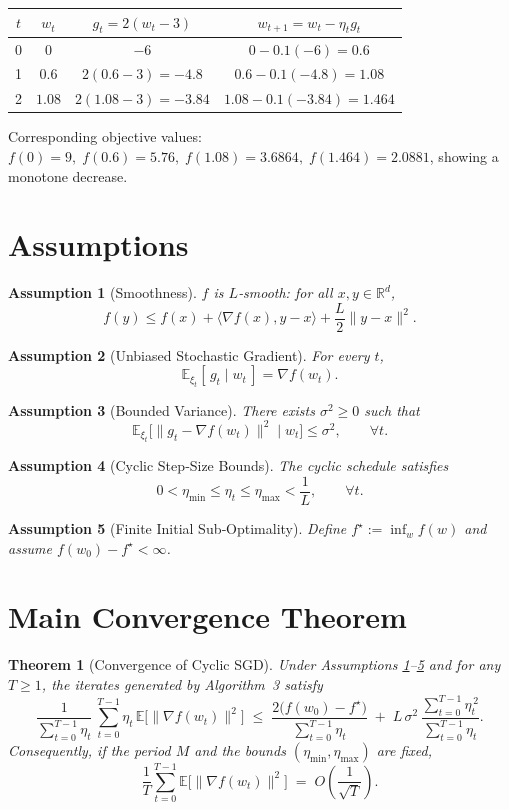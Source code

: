\documentclass{article}
\newtheorem{theorem}{Theorem}
\newtheorem{assumption}{Assumption}
\newcommand{\EE}{\mathbb{E}}
\newcommand{\RR}{\mathbb{R}}
\begin{document}
\begin{center}
\begin{tabular}{c|c|c|c}
$t$ & $w_t$ & $g_t=2(w_t-3)$ & $w_{t+1}=w_t-\eta_t g_t$ \\ \hline
0 & $0$ & $-6$ & $0-0.1(-6)=0.6$ \\
1 & $0.6$ & $2(0.6-3)=-4.8$ & $0.6-0.1(-4.8)=1.08$ \\
2 & $1.08$ & $2(1.08-3)=-3.84$ & $1.08-0.1(-3.84)=1.464$ \\
\end{tabular}
\end{center}
Corresponding objective values:
$f(0)=9,\;f(0.6)=5.76,\;f(1.08)=3.6864,\;f(1.464)=2.0881$,
showing a monotone decrease.

\newpage

\section*{Assumptions}
\begin{assumption}[Smoothness]\label{ass:smooth}
$f$ is $L$‑smooth: for all $x,y\in\RR^d$,
\[
f(y)\le f(x)+\langle\nabla f(x),y-x\rangle+\frac{L}{2}\|y-x\|^2 .
\]
\end{assumption}
\begin{assumption}[Unbiased Stochastic Gradient]\label{ass:unbiased}
For every $t$,
\[
\EE_{\xi_t}[\,g_t\mid w_t\,]=\nabla f(w_t).
\]
\end{assumption}
\begin{assumption}[Bounded Variance]\label{ass:variance}
There exists $\sigma^2\ge0$ such that
\[
\EE_{\xi_t}\bigl[\|g_t-\nabla f(w_t)\|^2\mid w_t\bigr]\le\sigma^2,
\qquad\forall t .
\]
\end{assumption}
\begin{assumption}[Cyclic Step‑Size Bounds]\label{ass:step}
The cyclic schedule satisfies
\[
0<\eta_{\min}\le\eta_t\le\eta_{\max}<\frac{1}{L},
\qquad\forall t .
\]
\end{assumption}
\begin{assumption}[Finite Initial Sub‑Optimality]\label{ass:initial}
Define $f^\star:=\inf_{w}f(w)$ and assume $f(w_0)-f^\star<\infty$.
\end{assumption}

\section*{Main Convergence Theorem}
\begin{theorem}[Convergence of Cyclic SGD]\label{thm:main}
Under Assumptions \ref{ass:smooth}–\ref{ass:initial} and for any $T\ge1$, the iterates generated by
Algorithm~3 satisfy
\[
\frac{1}{\sum_{t=0}^{T-1}\eta_t}\,
\sum_{t=0}^{T-1}\eta_t\,\EE\bigl[\|\nabla f(w_t)\|^2\bigr]
\;\le\;
\frac{2\bigl(f(w_0)-f^\star\bigr)}{\sum_{t=0}^{T-1}\eta_t}
\;+\;
L\,\sigma^2\,\frac{\sum_{t=0}^{T-1}\eta_t^{\,2}}{\sum_{t=0}^{T-1}\eta_t}.
\tag{4}
\]
Consequently, if the period $M$ and the bounds $(\eta_{\min},\eta_{\max})$ are fixed,
\[
\frac{1}{T}\sum_{t=0}^{T-1}\EE\bigl[\|\nabla f(w_t)\|^2\bigr]
\;=\;O\!\left(\frac{1}{\sqrt{T}}\right).
\]
\end{theorem}
\end{document}

